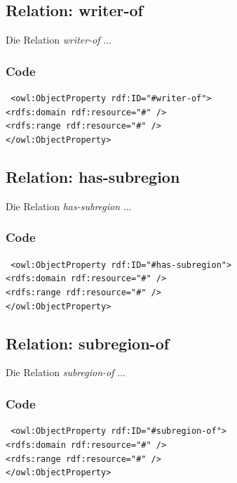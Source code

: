 ﻿\documentclass[
    11pt,
    latin1,
    a4paper,
    oneside
]{scrreprt}
\begin{document}
\subsection{Relation: writer-of} \label{sec:rel_writerof}

Die Relation \emph{writer-of} ...

\subsubsection{Code} \label{sec:rel_writerof_code}

\texttt{ <owl:ObjectProperty rdf:ID="#writer-of"> \\
	<rdfs:domain rdf:resource="#" /> \\
	<rdfs:range rdf:resource="#" /> \\
</owl:ObjectProperty> }


\subsection{Relation: has-subregion} \label{sec:rel_hassubregion}

Die Relation \emph{has-subregion} ...

\subsubsection{Code} \label{sec:rel_hassubregion_code}

\texttt{ <owl:ObjectProperty rdf:ID="#has-subregion"> \\
	<rdfs:domain rdf:resource="#" /> \\
	<rdfs:range rdf:resource="#" /> \\
</owl:ObjectProperty> }


\subsection{Relation: subregion-of} \label{sec:rel_subregionof}

Die Relation \emph{subregion-of} ...

\subsubsection{Code} \label{sec:rel_subregionof_code}

\texttt{ <owl:ObjectProperty rdf:ID="#subregion-of"> \\
	<rdfs:domain rdf:resource="#" /> \\
	<rdfs:range rdf:resource="#" /> \\
</owl:ObjectProperty> }
\end{document}
